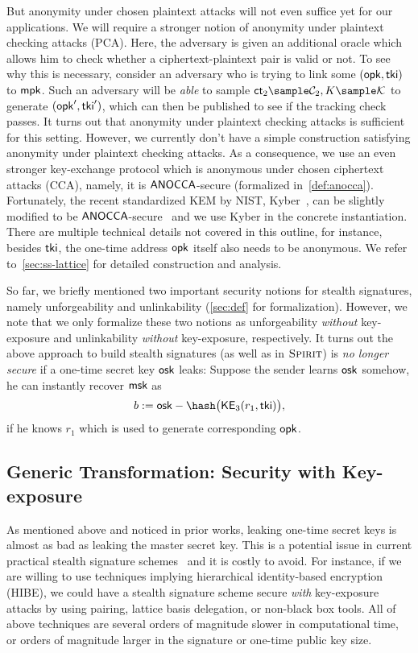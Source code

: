 But anonymity under chosen plaintext attacks will not even suffice yet for our applications. We will require a stronger notion of anonymity under plaintext checking attacks (PCA). Here, the adversary is given an additional oracle which allows him to check whether a ciphertext-plaintext pair is valid or not. To see why this is necessary, consider an adversary who is trying to link some $(\mathsf{opk},\mathsf{tki})$ to $\mathsf{mpk}$. Such an adversary will be \emph{able} to sample $\ct_2\sample\Cc_2,K\sample \Kc$ to generate $(\mathsf{opk}',\mathsf{tki}')$, which can then be published to see if the tracking check passes. It turns out that anonymity under plaintext checking attacks is sufficient for this setting.
However, we currently don't have a simple construction satisfying anonymity under plaintext checking attacks. As a consequence, we use an even stronger key-exchange protocol which is anonymous under chosen ciphertext attacks (CCA), namely, it is $\mathsf{ANOCCA}$-secure (formalized in~\cref{def:anocca}). Fortunately, the recent standardized KEM by NIST, Kyber~\cite{NISTPQC-R3:CRYSTALS-KYBER20}, can be slightly modified to be $\mathsf{ANOCCA}$-secure~\cite{EC:GruMarPat22} and we use Kyber in the concrete instantiation. There are multiple technical details not covered in this outline, for instance, besides $\mathsf{tki}$, the one-time address $\mathsf{opk}$ itself also needs to be anonymous. We refer to~\cref{sec:ss-lattice} for detailed construction and analysis.

So far, we briefly mentioned two important security notions for stealth signatures, namely unforgeability and unlinkability (\cref{sec:def} for formalization). However, we note that we only formalize these two notions as unforgeability \emph{without} key-exposure and unlinkability \emph{without} key-exposure, respectively. It turns out the above approach to build stealth signatures (as well as in $\textsc{Spirit}$) is \emph{no longer secure} if a one-time secret key $\mathsf{osk}$ leaks: Suppose the sender learns $\mathsf{osk}$ somehow, he can instantly recover $\mathsf{msk}$ as $$b:=\osk-\hash\big(\ke_3(r_1,\tki)\big),$$ if he knows $r_1$ which is used to generate corresponding $\mathsf{opk}$.

\subsection{Generic Transformation: Security with Key-exposure}
As mentioned above and noticed in prior works\cite{EUROSP:LYWNW19,NMR2016}, leaking one-time secret keys is almost as bad as leaking the master secret key. This is a potential issue in current practical stealth signature schemes~\cite{stealth2} and it is costly to avoid. For instance, if we are willing to use techniques implying hierarchical identity-based encryption (HIBE), we could have a stealth signature scheme secure \emph{with} key-exposure attacks by using pairing\cite{C:BonFra01,EUROSP:LYWNW19}, lattice basis delegation\cite{EC:AgrBonBoy10,ESORICS:LLNYY20}, or non-black box tools\cite{C:DotGar17}. All of above techniques are several orders of magnitude slower in computational time, or orders of magnitude larger in the signature or one-time public key size.

